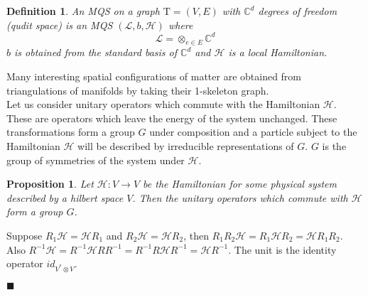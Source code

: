 \documentclass{article}
\newtheorem{definition}{Definition}
\newtheorem{proposition}[theorem]{Proposition}
\newenvironment{proof}[1][Proof]{\begin{trivlist}
\item[\hskip \labelsep {\bfseries #1}]}{\begin{flushright}$\blacksquare$\end{flushright} \end{trivlist}}
\newcommand{\Tau}{\mathrm{T}}
\newcommand{\ham}{\mathcal{H}}
\begin{document}
\begin{definition}
An MQS on a graph $\Tau = (V,E)$ with $\mathbb{C}^d$ degrees of freedom (qudit space) is an MQS $(\mathcal{L},b, \mathcal{H})$ where
$$ \mathcal{L} = \otimes_{e\in E} \mathbb{C}^d$$
$b$ is obtained from the standard basis of $\mathbb{C}^d$ and $\mathcal{H}$ is a local Hamiltonian.
\end{definition}
Many interesting spatial configurations of matter are obtained from triangulations of manifolds by taking their 1-skeleton graph.\\
Let us consider unitary operators which commute with the Hamiltonian $\mathcal{H}$. These are operators which leave the energy of the system unchanged. These transformations form a group $G$ under composition and a particle subject to the Hamiltonian $\mathcal{H}$ will be described by irreducible representations of $G$. $G$ is the group of symmetries of the system under $\mathcal{H}$.

\begin{proposition}
Let $\mathcal{H}:V\rightarrow V$ be the Hamiltonian for some physical system described by a hilbert space $V$. Then the unitary operators which commute with $\mathcal{H}$ form a group $G$.
\end{proposition}
\begin{proof}
Suppose $R_1\ham=\ham R_1$ and $R_2\ham=\ham R_2$, then $R_1R_2\ham=R_1\ham R_2 = \ham R_1R_2$. Also $R^{-1}\ham = R^{-1}\ham RR^{-1} = R^{-1}R\ham R^{-1} =\ham R^{-1}$. The unit is the identity operator $id_{V^*\otimes V}$.
\end{proof}
\end{document}
